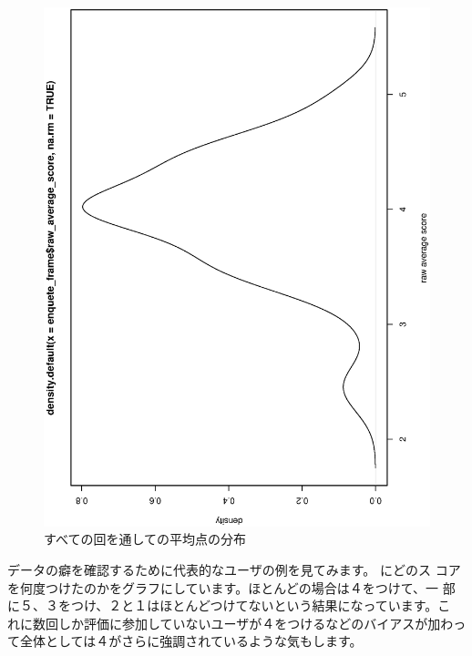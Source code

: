 \documentclass[mingoth,a4paper]{jsarticle}
\begin{document}
\begin{figure}[ht]
\begin{minipage}{0.5\hsize}
\begin{center}
  \includegraphics[width=0.8\hsize,angle=270]{image201301/raw_average_score_density.eps}
\end{center} 
 \caption{すべての回を通しての平均点の分布}
 \label{fig:all-enquete-score-distribution}
\end{minipage}
\end{figure}

データの癖を確認するために代表的なユーザの例を見てみます。
にどのス
コアを何度つけたのかをグラフにしています。ほとんどの場合は４をつけて、一
部に５、３をつけ、２と１はほとんどつけてないという結果になっています。こ
れに数回しか評価に参加していないユーザが４をつけるなどのバイアスが加わっ
て全体としては４がさらに強調されているような気もします。
\end{document}
